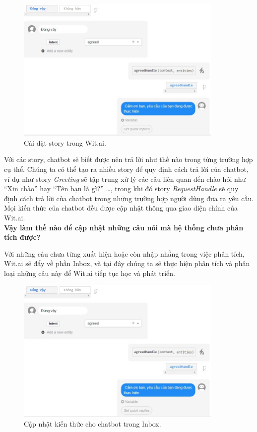 \documentclass[12pt]{report}
\begin{document}
\begin{figure}[H] \label{fig:story-wit}
	\centering
	\includegraphics[width=10cm]{Pics/Chap6/story.JPG}
	\caption{Cài đặt story trong Wit.ai.}
\end{figure}

Với các story, chatbot sẽ biết được nên trả lời như thế nào trong từng trường hợp cụ thể. Chúng ta có thể tạo ra nhiều story để quy định cách trả lời của chatbot, ví dụ như story \textit{Greeting} sẽ tập trung xử lý các câu liên quan đến chào hỏi như ``Xin chào'' hay ``Tên bạn là gì?'' \ldots, trong khi đó story \textit{RequestHandle} sẽ quy định cách trả lời của chatbot trong những trường hợp người dùng đưa ra yêu cầu. Mọi kiến thức của chatbot đều được cập nhật thông qua giao diện chính của Wit.ai. \\[0.3mm]

\noindent \textbf{Vậy làm thế nào để cập nhật những câu nói mà hệ thống chưa phân tích được?\\[0.3cm]}

Với những câu chưa từng xuất hiện hoặc còn nhập nhằng trong việc phân tích, Wit.ai sẽ đẩy về phần Inbox, và tại đây chúng ta sẽ thực hiện phân tích và phân loại những câu này để Wit.ai tiếp tục học và phát triển.

\begin{figure}[H] \label{fig:inbox-wit}
	\centering
	\includegraphics[width=10cm]{Pics/Chap6/story.JPG}
	\caption{Cập nhật kiến thức cho chatbot trong Inbox.}
\end{figure}
\end{document}
